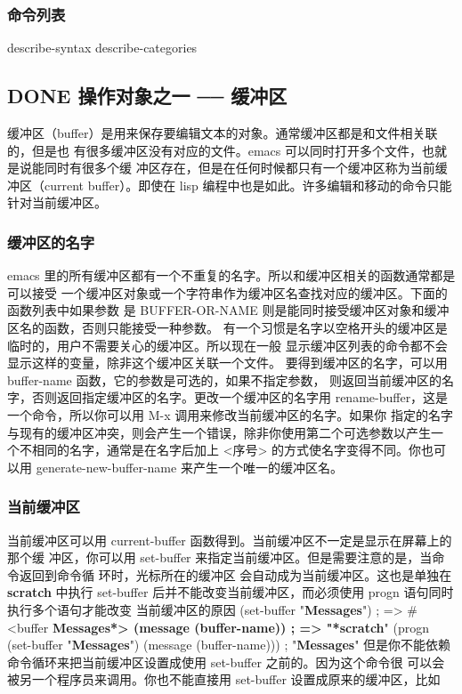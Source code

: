 \documentclass[11pt]{ctexart}
\begin{document}
{{{{\subsubsection{命令列表}
\label{sec:orgf79a502}
describe-syntax
describe-categories
\subsection{{\bfseries\sffamily DONE} 操作对象之一 ── 缓冲区}
\label{sec:orgd9e5b0e}
缓冲区（buffer）是用来保存要编辑文本的对象。通常缓冲区都是和文件相关联的，但是也
有很多缓冲区没有对应的文件。emacs 可以同时打开多个文件，也就是说能同时有很多个缓
冲区存在，但是在任何时候都只有一个缓冲区称为当前缓冲区（current buffer）。即使在
lisp 编程中也是如此。许多编辑和移动的命令只能针对当前缓冲区。

\subsubsection{缓冲区的名字}
\label{sec:org5b09ea9}

emacs 里的所有缓冲区都有一个不重复的名字。所以和缓冲区相关的函数通常都是可以接受
一个缓冲区对象或一个字符串作为缓冲区名查找对应的缓冲区。下面的函数列表中如果参数
是 BUFFER-OR-NAME 则是能同时接受缓冲区对象和缓冲区名的函数，否则只能接受一种参数。
有一个习惯是名字以空格开头的缓冲区是临时的，用户不需要关心的缓冲区。所以现在一般
显示缓冲区列表的命令都不会显示这样的变量，除非这个缓冲区关联一个文件。
要得到缓冲区的名字，可以用 buffer-name 函数，它的参数是可选的，如果不指定参数，
则返回当前缓冲区的名字，否则返回指定缓冲区的名字。更改一个缓冲区的名字用
rename-buffer，这是一个命令，所以你可以用 M-x 调用来修改当前缓冲区的名字。如果你
指定的名字与现有的缓冲区冲突，则会产生一个错误，除非你使用第二个可选参数以产生一
个不相同的名字，通常是在名字后加上 <序号> 的方式使名字变得不同。你也可以用
generate-new-buffer-name 来产生一个唯一的缓冲区名。

\subsubsection{当前缓冲区}
\label{sec:org1112020}

当前缓冲区可以用 current-buffer 函数得到。当前缓冲区不一定是显示在屏幕上的那个缓
冲区，你可以用 set-buffer 来指定当前缓冲区。但是需要注意的是，当命令返回到命令循
环时，光标所在的缓冲区 会自动成为当前缓冲区。这也是单独在 \textbf{scratch} 中执行
set-buffer 后并不能改变当前缓冲区，而必须使用 progn 语句同时执行多个语句才能改变
当前缓冲区的原因
(set-buffer "\textbf{Messages}")   ; => \#<buffer \textbf{Messages*>
(message (buffer-name))                  ; => "*scratch}"
(progn
(set-buffer "\textbf{Messages}")
(message (buffer-name)))               ; "\textbf{Messages}"
但是你不能依赖命令循环来把当前缓冲区设置成使用 set-buffer 之前的。因为这个命令很
可以会被另一个程序员来调用。你也不能直接用 set-buffer 设置成原来的缓冲区，比如

}}}}
\end{document}
